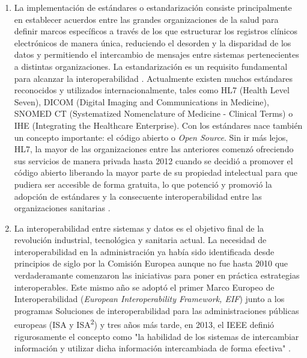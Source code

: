 \begin{enumerate}[label=\alph*.]

    \item La implementación de estándares o estandarización consiste principalmente en establecer acuerdos entre las grandes organizaciones de la salud para definir marcos específicos a través de los que estructurar los registros clínicos electrónicos de manera única, reduciendo el desorden y la disparidad de los datos y permitiendo el intercambio de mensajes entre sistemas pertenecientes a distintas organizaciones. La estandarización es un requisito fundamental para alcanzar la interoperabilidad \cite{katehakis2019framework}. Actualmente existen muchos estándares reconocidos y utilizados internacionalmente, tales como HL7 (Health Level Seven), DICOM (Digital Imaging and Communications in Medicine), SNOMED CT (Systematized Nomenclature of Medicine - Clinical Terms) o IHE (Integrating the Healthcare Enterprise). Con los estándares nace también un concepto importante: el código abierto o \textit{Open Source}. Sin ir más lejos, HL7, la mayor de las organizaciones entre las anteriores comenzó ofreciendo sus servicios de manera privada hasta 2012 cuando se decidió a promover el código abierto liberando la mayor parte de su propiedad intelectual para que pudiera ser accesible de forma gratuita, lo que potenció y promovió la adopción de estándares y la consecuente interoperabilidad entre las organizaciones sanitarias \cite{berryman2013data}.

    \item  La interoperabilidad entre sistemas y datos es el objetivo final de la revolución industrial, tecnológica y sanitaria actual. La necesidad de interoperabilidad en la administración ya había sido identificada desde principios de siglo por la Comisión Europea \cite{CEU1999ida} aunque no fue hasta 2010 que verdaderamante comenzaron las iniciativas para poner en práctica estrategias interoperables. Este mismo año se adoptó el primer Marco Europeo de Interoperabilidad (\textit{European Interoperability Framework, EIF}) junto a los programas Soluciones de interoperabilidad para las administraciones públicas europeas (ISA y ISA\textsuperscript{2}) y tres años más tarde, en 2013,  el IEEE definió rigurosamente el concepto como "la habilidad de los sistemas de intercambiar información y utilizar dicha información intercambiada de forma efectiva" \cite{berryman2013data}. 
    

\end{enumerate}
